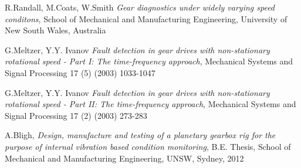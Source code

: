 \documentclass[]{unswthesis}
\begin{document}
\begin{thebibliography}{99}
  R.Randall, M.Coats, W.Smith \textit{Gear diagnostics under widely varying speed conditons}, School of Mechanical and Manufacturing Engineering, University of New South Wales, Australia
 
  G.Meltzer, Y.Y. Ivanov \textit{Fault detection in gear drives with non-stationary rotational speed - Part I: The time-frequency approach}, Mechanical Systems and Signal Processing 17 (5) (2003) 1033-1047
 
  G.Meltzer, Y.Y. Ivanov \textit{Fault detection in gear drives with non-stationary rotational speed - Part II: The time-frequency approach}, Mechanical Systems and Signal Processing 17 (2) (2003) 273-283
  
  A.Bligh, \textit{Design, manufacture and testing of a planetary gearbox rig for the purpose of internal vibration based condition monitoring}, B.E. Thesis, School of Mechanical and Manufacturing Engineering, UNSW, Sydney, 2012
  
\end{thebibliography}



\end{document}
